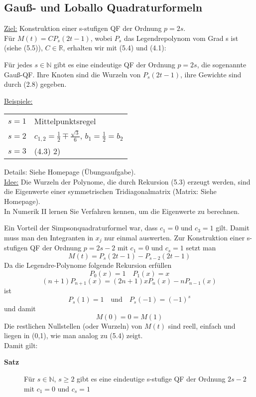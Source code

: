 \subsection{Gauß- und Loballo Quadraturformeln}

\underline{Ziel:} Konstruktion einer s-stufigen QF der Ordnung $p=2s$.\\
Für $M(t) = CP_s(2t-1)$, wobei $P_s$ das Legendrepolynom vom Grad s ist (siehe (5.5)), $C \in \mathbb{R}$, erhalten wir mit (5.4) und (4.1):

\begin{theorem}
Für jedes $s \in \mathbb{N}$ gibt es eine eindeutige QF der Ordnung $p=2s$, die sogenannte Gauß-QF. Ihre Knoten sind die Wurzeln von $P_s(2t-1)$, ihre Gewichte sind durch (2.8) gegeben. 
\end{theorem}
\underline{Beispiele:} \\
\begin{tabular}{ll}
 
$s=1$ & Mittelpunktsregel \\

$s=2$ & $c_{1,2} = \frac{1}{2} \mp \frac{\sqrt{3}}{6}$, $b_1=\frac{1}{2} = b_2$ \\

$s=3$ & (4.3) 2) \\

\end{tabular}

\begin{nothing}
Details: Siehe Homepage (Übungsaufgabe). \\
\underline{Idee:} Die Wurzeln der Polynome, die durch Rekursion (5.3) erzeugt werden, sind die Eigenwerte einer symmetrischen Tridiagonalmatrix (Matrix: Siehe Homepage).\\
In Numerik II lernen Sie Verfahren kennen, um die Eigenwerte zu berechnen.
\end{nothing}

\begin{nothing}
Ein Vorteil der Simpsonquadraturformel war, dass $c_1=0$ und $c_3=1$ gilt. Damit muss man den Integranten in $x_j$ nur einmal auswerten. Zur Konstruktion einer s-stufigen QF der Ordnung $p=2s-2$ mit $c_1=0$ und $c_s=1$ setzt man 
$$M(t) = P_s(2t-1) - P_{s-2}(2t-1)$$
Da die Legendre-Polynome folgende Rekursion erfüllen
$$P_0(x)=1 \quad P_1(x) = x $$
$$ (n+1)P_{n+1}(x) = (2n+1)xP_n(x) - nP_{n-1}(x)$$
ist 
$$ P_s(1) = 1 \quad \text{und} \quad P_s(-1) = (-1)^s$$
und damit 
$$M(0) = 0 = M(1)$$
Die restlichen Nullstellen (oder Wurzeln) von $M(t)$ sind reell, einfach und liegen in (0,1), wie man analog zu (5.4) zeigt.\\
Damit gilt:
\begin{description}
  \item[\textbf{Satz}]
    Für $s \in \mathbb{N}$, $s \geq 2$ gibt es eine eindeutige s-stufige QF der Ordnung $2s-2$ mit $c_1=0$ und $c_s=1$
\end{description}
\end{nothing}